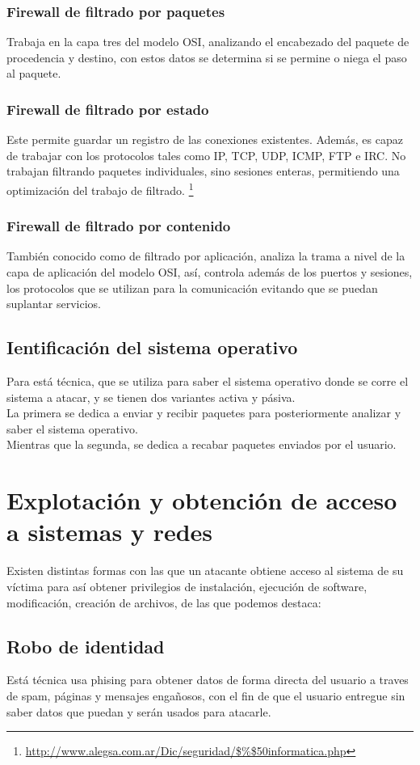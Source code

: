 \documentclass[11pt,a4paper]{article}
\begin{document}
\subsubsection{Firewall de filtrado por paquetes}
Trabaja en la capa tres del modelo OSI, analizando el encabezado del paquete de procedencia y destino, con estos datos se determina si se permine o niega el paso al paquete.
\subsubsection{Firewall de filtrado por estado}
Este permite guardar un registro de las conexiones existentes. Además, es capaz de  trabajar  con  los  protocolos  tales  como IP, TCP, UDP, ICMP, FTP  e IRC.  No trabajan  filtrando  paquetes  individuales, sino  sesiones  enteras, permitiendo una optimización del trabajo de filtrado. 
\footnote{ \url{ http://www.alegsa.com.ar/Dic/seguridad/$\%$50informatica.php}}
\subsubsection{Firewall de filtrado por contenido}
También conocido como de filtrado por aplicación, analiza la trama a nivel de la capa  de  aplicación  del  modelo OSI,  así,  controla  además  de  los  puertos  y sesiones,  los  protocolos  que  se  utilizan  para  la  comunicación  evitando  que  se puedan suplantar servicios.

\subsection{Ientificación del sistema operativo}
Para está técnica, que se utiliza para saber el sistema operativo donde se corre el sistema a atacar, y se tienen dos variantes activa y pásiva.\\
La primera se dedica a enviar y recibir paquetes para posteriormente analizar y saber el sistema operativo.\\
Mientras que la segunda, se dedica a recabar paquetes enviados por el usuario.
\section{Explotación y obtención de acceso a sistemas y redes}
Existen distintas formas con las que un atacante obtiene acceso al sistema de su víctima para así obtener privilegios de instalación, ejecución de software, modificación, creación de archivos, de las que podemos destaca:
\subsection{Robo de identidad}
Está técnica usa phising para obtener datos de forma directa del usuario a traves de spam, páginas y mensajes engañosos, con el fin de que el usuario entregue sin saber datos que puedan y serán usados para atacarle.
\end{document}
